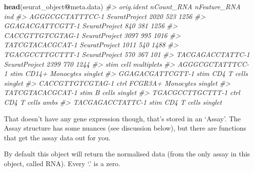 \documentclass[
]{book}
\newenvironment{Shaded}{\begin{snugshade}}{\end{snugshade}}
\newcommand{\CommentTok}[1]{\textcolor[rgb]{0.56,0.35,0.01}{\textit{#1}}}
\newcommand{\FunctionTok}[1]{\textcolor[rgb]{0.13,0.29,0.53}{\textbf{#1}}}
\newcommand{\NormalTok}[1]{#1}
\newcommand{\SpecialCharTok}[1]{\textcolor[rgb]{0.81,0.36,0.00}{\textbf{#1}}}
\begin{document}
\begin{Shaded}
\begin{Highlighting}[]
\FunctionTok{head}\NormalTok{(seurat\_object}\SpecialCharTok{@}\NormalTok{meta.data)}
\CommentTok{\#\textgreater{}                     orig.ident nCount\_RNA nFeature\_RNA  ind}
\CommentTok{\#\textgreater{} AGGGCGCTATTTCC{-}1 SeuratProject       2020          523 1256}
\CommentTok{\#\textgreater{} GGAGACGATTCGTT{-}1 SeuratProject        840          381 1256}
\CommentTok{\#\textgreater{} CACCGTTGTCGTAG{-}1 SeuratProject       3097          995 1016}
\CommentTok{\#\textgreater{} TATCGTACACGCAT{-}1 SeuratProject       1011          540 1488}
\CommentTok{\#\textgreater{} TGACGCCTTGCTTT{-}1 SeuratProject        570          367  101}
\CommentTok{\#\textgreater{} TACGAGACCTATTC{-}1 SeuratProject       2399          770 1244}
\CommentTok{\#\textgreater{}                  stim              cell multiplets}
\CommentTok{\#\textgreater{} AGGGCGCTATTTCC{-}1 stim   CD14+ Monocytes    singlet}
\CommentTok{\#\textgreater{} GGAGACGATTCGTT{-}1 stim       CD4 T cells    singlet}
\CommentTok{\#\textgreater{} CACCGTTGTCGTAG{-}1 ctrl FCGR3A+ Monocytes    singlet}
\CommentTok{\#\textgreater{} TATCGTACACGCAT{-}1 stim           B cells    singlet}
\CommentTok{\#\textgreater{} TGACGCCTTGCTTT{-}1 ctrl       CD4 T cells       ambs}
\CommentTok{\#\textgreater{} TACGAGACCTATTC{-}1 stim       CD4 T cells    singlet}
\end{Highlighting}
\end{Shaded}

That doesn't have any gene expression though, that's stored in an `Assay'.
The Assay structure has some nuances (see discussion below), but there are functions that get the assay data out for you.

By default this object will return the normalised data (from the only assay in this object, called RNA). Every `.' is a zero.
\end{document}
